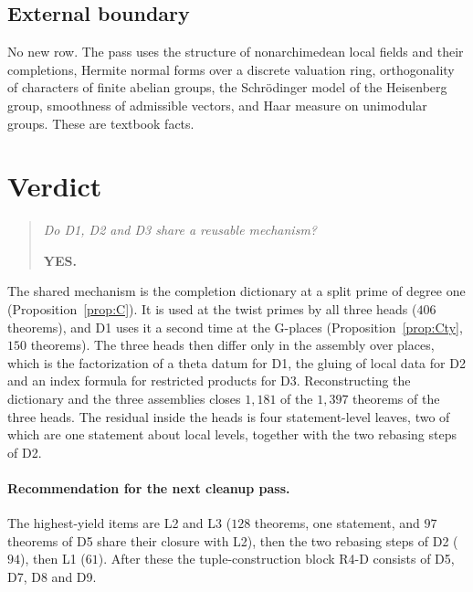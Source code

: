 \documentclass[11pt]{article}
\theoremstyle{definition}
\theoremstyle{remark}
\begin{document}
\subsection{External boundary}
No new row. The pass uses the structure of nonarchimedean local fields and their completions, Hermite normal forms over a discrete valuation ring, orthogonality of characters of finite abelian groups, the Schr\"odinger model of the Heisenberg group, smoothness of admissible vectors, and Haar measure on unimodular groups. These are textbook facts.

\section{Verdict}

\begin{quote}
\emph{Do D1, D2 and D3 share a reusable mechanism?}

\textbf{YES.}
\end{quote}

\noindent The shared mechanism is the completion dictionary at a split prime of degree one (Proposition~\ref{prop:C}). It is used at the twist primes by all three heads ($406$ theorems), and D1 uses it a second time at the G-places (Proposition~\ref{prop:Cty}, $150$ theorems). The three heads then differ only in the assembly over places, which is the factorization of a theta datum for D1, the gluing of local data for D2 and an index formula for restricted products for D3. Reconstructing the dictionary and the three assemblies closes $1{,}181$ of the $1{,}397$ theorems of the three heads. The residual inside the heads is four statement-level leaves, two of which are one statement about local levels, together with the two rebasing steps of D2.

\paragraph{Recommendation for the next cleanup pass.} The highest-yield items are L2 and L3 ($128$ theorems, one statement, and $97$ theorems of D5 share their closure with L2), then the two rebasing steps of D2 ($94$), then L1 ($61$). After these the tuple-construction block R4-D consists of D5, D7, D8 and D9.

\appendix
\end{document}
